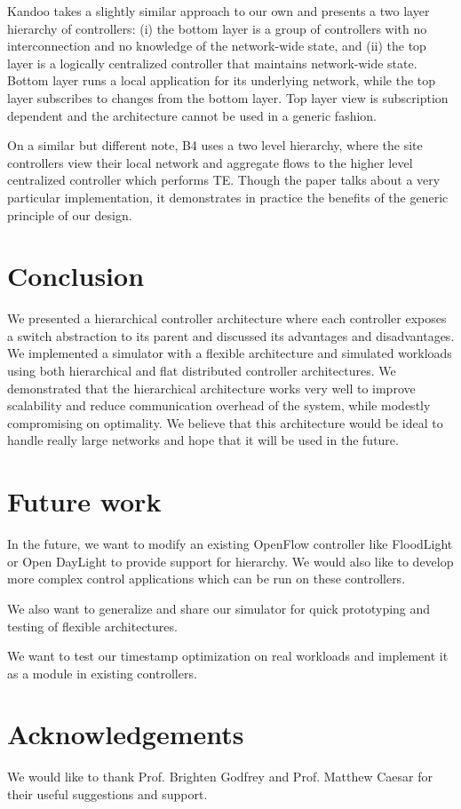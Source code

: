 \documentclass[10pt, twocolumn]{article}
\begin{document}
Kandoo\cite{kandoo} takes a slightly similar approach to our own and presents a two layer hierarchy of controllers: (i) the bottom layer is a group of controllers with no interconnection and no knowledge of the network-wide state, and (ii) the top layer is a logically centralized controller that maintains network-wide state. Bottom layer runs a local application for its underlying network, while the top layer subscribes to changes from the bottom layer. Top layer view is subscription dependent and the architecture cannot be used in a generic fashion.

On a similar but different note, B4\cite{b4} uses a two level hierarchy, where the site controllers view their local network and aggregate flows to the higher level centralized controller which performs TE. Though the paper talks about a very particular implementation, it demonstrates in practice the benefits of the generic principle of our design.

\section{Conclusion}
\label{sec:conc}
We presented a hierarchical controller architecture where each controller exposes a switch abstraction to its parent and discussed its advantages and disadvantages. We implemented a simulator with a flexible architecture and simulated workloads using both hierarchical and flat distributed controller architectures. We demonstrated that the hierarchical architecture works very well to improve scalability and reduce communication overhead of the system, while modestly compromising on optimality. We believe that this architecture would be ideal to handle really large networks and hope that it will be used in the future.

\section{Future work}
\label{sec:future}
In the future, we want to modify an existing OpenFlow controller like FloodLight or Open DayLight to provide support for hierarchy. We would also like to develop more complex control applications which can be run on these controllers.

We also want to generalize and share our simulator for quick prototyping and testing of flexible architectures.

We want to test our timestamp optimization on real workloads and implement it as a module in existing controllers.

\section{Acknowledgements}
\label{sec:ack}
We would like to thank Prof. Brighten Godfrey and Prof. Matthew Caesar for their useful suggestions and support. 
\nocite{*}



\end{document}
